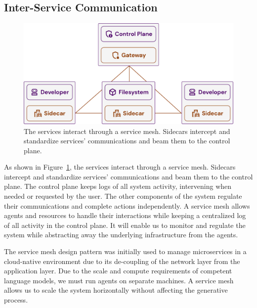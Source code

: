 \documentclass[a4paper,twocolumn,11pt]{quantumarticle}
\begin{document}
\subsection{Inter-Service Communication}
\begin{figure}[t]
  \centering
  \includegraphics[width=\columnwidth]{figures/inter-service_interaction.pdf}
  \caption{The services interact through a service mesh. Sidecars intercept and standardize services' communications and beam them to the control plane.}
  \label{fig:inter-service_interaction}
\end{figure}
As shown in Figure~\ref{fig:inter-service_interaction}, the services interact through a service mesh. Sidecars intercept and standardize services' communications and beam them to the control plane. The control plane keeps logs of all system activity, intervening when needed or requested by the user. The other components of the system regulate their communications and complete actions independently. A service mesh allows agents and resources to handle their interactions while keeping a centralized log of all activity in the control plane. It will enable us to monitor and regulate the system while abstracting away the underlying infrastructure from the agents.

The service mesh design pattern was initially used to manage microservices in a cloud-native environment due to its de-coupling of the network layer from the application layer\cite{LiService}. Due to the scale and compute requirements of competent language models\cite{Touvron2023LLaMA}, we must run agents on separate machines. A service mesh allows us to scale the system horizontally without affecting the generative process.
\end{document}
